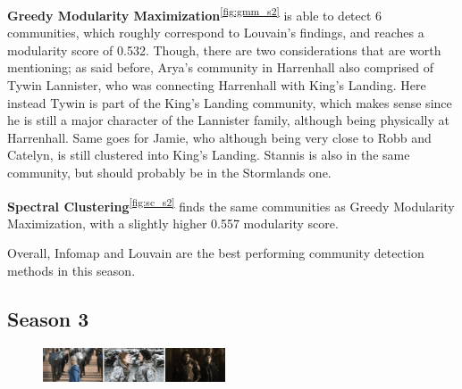\documentclass[10pt,twocolumn,letterpaper]{article}
\begin{document}
\textbf{Greedy Modularity Maximization}\textsuperscript{\ref{fig:gmm_s2}} is able to detect 6 communities, which roughly correspond to Louvain's findings, and reaches a modularity score of 0.532. Though, there are two considerations that are worth mentioning; as said before, Arya's community in Harrenhall also comprised of Tywin Lannister, who was connecting Harrenhall with King's Landing. Here instead Tywin is part of the King's Landing community, which makes sense since he is still a major character of the Lannister family, although being physically at Harrenhall. Same goes for Jamie, who although being very close to Robb and Catelyn, is still clustered into King's Landing. Stannis is also in the same community, but should probably be in the Stormlands one.

\textbf{Spectral Clustering}\textsuperscript{\ref{fig:sc_s2}} finds the same communities as Greedy Modularity Maximization, with a slightly higher 0.557 modularity score.

Overall, Infomap and Louvain are the best performing community detection methods in this season.



\subsection{Season 3}

\begin{figure}[!h] 
    \centering
    \includegraphics[width=0.48\textwidth]{img/s3/frames_s3.jpg}
\end{figure}
\end{document}
